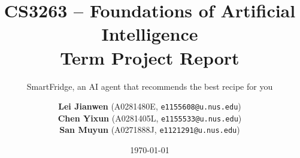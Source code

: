 \documentclass{article}
\begin{document}
\title{
  CS3263 -- Foundations of Artificial Intelligence
  \\
  Term Project Report
}

\subtitle{SmartFridge, an AI agent that recommends the best recipe for you}

\author{
    \textbf{Lei Jianwen} (A0281480E, \texttt{e1155608@u.nus.edu}) \\
    \textbf{Chen Yixun}  (A0281405L, \texttt{e1155533@u.nus.edu}) \\
    \textbf{San Muyun}   (A0271888J, \texttt{e1121291@u.nus.edu}) \\
}

\date{\today}
\maketitle







\end{document}

